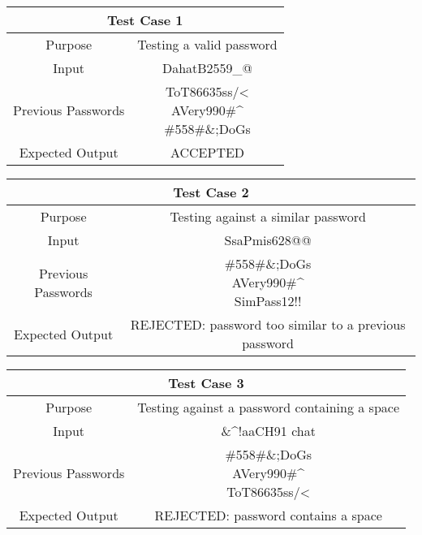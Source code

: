 \documentclass[12pt,letterpaper]{article}
\begin{document}
\begin{center}
  \begin{tabular}{||c|c||}
  \hline
  \multicolumn{2}{||c||}{Test Case 1} \\
  \hline
  Purpose & Testing a valid password \\
  \hline
  Input & DahatB2559\_@ \\
  \hline
  Previous Passwords & \specialcell{ToT86635ss/\textless\\AVery990\#\^{}\\\#558\#\&;DoGs} \\%
  \hline
  Expected Output & ACCEPTED \\
  \hline
  \end{tabular}
\end{center}
\vspace{1mm}
\begin{center}
  \begin{tabular}{||c|c||}
  \hline
  \multicolumn{2}{||c||}{Test Case 2} \\
  \hline
  Purpose & Testing against a similar password \\
  \hline
  Input & SsaPmis628@@ \\
  \hline
  Previous Passwords &  \specialcell{\#558\#\&;DoGs\\AVery990\#\^{}\\SimPass12!!} \\
  \hline
  Expected Output & REJECTED: password too similar to a previous password \\
  \hline
  \end{tabular}
\end{center}
\vspace{1mm}
\begin{center}
  \begin{tabular}{||c|c||}
  \hline
  \multicolumn{2}{||c||}{Test Case 3} \\
  \hline
  Purpose & Testing against a password containing a space\\
  \hline
  Input & \&\^{}!aaCH91 chat \\
  \hline
  Previous Passwords &  \specialcell{\#558\#\&;DoGs\\AVery990\#\^{}\\ToT86635ss/\textless} \\
  \hline
  Expected Output & REJECTED: password contains a space \\
  \hline
  \end{tabular}
\end{center}
\end{document}
